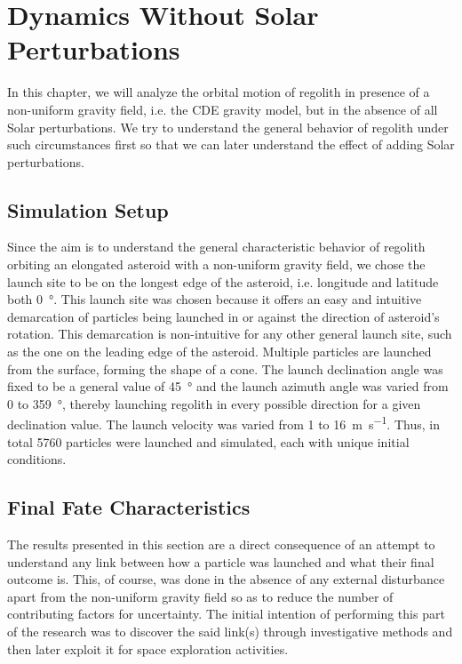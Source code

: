 \chapter{Dynamics Without Solar Perturbations}
\label{chap:dynamics_without_solar_perturbations}
\graphicspath{{Results/}}

In this chapter, we will analyze the orbital motion of regolith in presence of a non-uniform gravity field, i.e. the \gls{CDE} gravity model, but in the absence of all Solar perturbations. We try to understand the general behavior of regolith under such circumstances first so that we can later understand the effect of adding Solar perturbations.

\section{Simulation Setup}
\label{sec:simulation_setup_noSP}
Since the aim is to understand the general characteristic behavior of regolith orbiting an elongated asteroid with a non-uniform gravity field, we chose the launch site to be on the longest edge of the asteroid, i.e. longitude and latitude both \SI{0}{\degree}. This launch site was chosen because it offers an easy and intuitive demarcation of particles being launched in or against the direction of asteroid's rotation. This demarcation is non-intuitive for any other general launch site, such as the one on the leading edge of the asteroid.
%
\newline\newline
%
Multiple particles are launched from the surface, forming the shape of a cone. The launch declination angle was fixed to be a general value of \SI{45}{\degree} and the launch azimuth angle was varied from 0 to \SI{359}{\degree}, thereby launching regolith in every possible direction for a given declination value. The launch velocity was varied from 1 to \SI{16}{\metre \per \second}. Thus, in total 5760 particles were launched and simulated, each with unique initial conditions.

\section{Final Fate Characteristics}
\label{sec:final_fate_characteristics_noSP}
The results presented in this section are a direct consequence of an attempt to understand any link between how a particle was launched and what their final outcome is. This, of course, was done in the absence of any external disturbance apart from the non-uniform gravity field so as to reduce the number of contributing factors for uncertainty. The initial intention of performing this part of the research was to discover the said link(s) through investigative methods and then later exploit it for space exploration activities.

